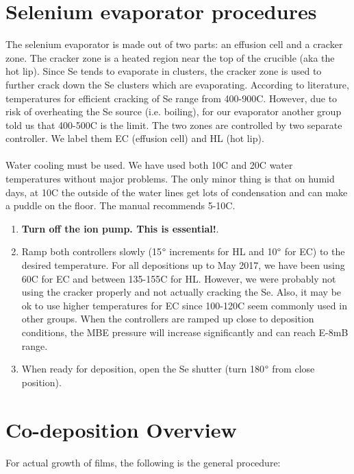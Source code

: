 \section{Selenium evaporator procedures}
The selenium evaporator is made out of two parts: an effusion cell and a cracker zone. The cracker zone is a heated region near the top of the crucible (aka the hot lip). Since Se tends to evaporate in clusters, the cracker zone is used to further crack down the Se clusters which are evaporating. According to literature, temperatures for efficient cracking of Se range from 400-900C. However, due to risk of overheating the Se source (i.e. boiling), for our evaporator another group told us that 400-500C is the limit. The two zones are controlled by two separate controller. We label them EC (effusion cell) and HL (hot lip).\\\\ 
Water cooling must be used. We have used both 10C and 20C water temperatures without major problems. The only minor thing is that on humid days, at 10C the outside of the water lines get lots of condensation and can make a puddle on the floor. The manual recommends 5-10C.
\begin{enumerate}
\item \textbf{Turn off the ion pump. This is essential!}.
\item Ramp both controllers slowly (15$\degree$ increments for HL and 10$\degree$ for EC) to the desired temperature. For all depositions up to May 2017, we have been using 60C for EC and between 135-155C for HL. However, we were probably not using the cracker properly and not actually cracking the Se. Also, it may be ok to use higher temperatures for EC since 100-120C seem commonly used in other groups. When the controllers are ramped up close to deposition conditions, the MBE pressure will increase significantly and can reach E-8mB range. 
\item When ready for deposition, open the Se shutter (turn 180$\degree$ from close position).
\end{enumerate}

\section{Co-deposition Overview}
For actual growth of films, the following is the general procedure:

